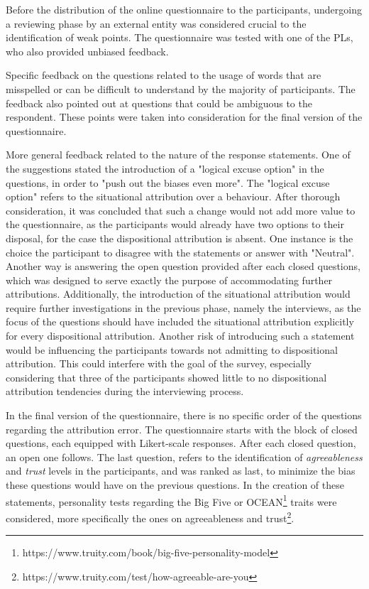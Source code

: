 Before the distribution of the online questionnaire to the participants, undergoing a reviewing phase by an external entity was considered crucial to the identification of weak points. The questionnaire was tested with one of the PLs, who also provided unbiased feedback.

Specific feedback on the questions related to the usage of words that are misspelled or can be difficult to understand by the majority of participants. The feedback also pointed out at questions that could be ambiguous to the respondent. These points were taken into consideration for the final version of the questionnaire.

More general feedback related to the nature of the response statements. One of the suggestions stated the introduction of a "logical excuse option" in the questions, in order to "push out the biases even more". The "logical excuse option" refers to the situational attribution over a behaviour. After thorough consideration, it was concluded that such a change would not add more value to the questionnaire, as the participants would already have two options to their disposal, for the case the dispositional attribution is absent. One instance is the choice the participant to disagree with the statements or answer with "Neutral". Another way is answering the open question provided after each closed questions, which was designed to serve exactly the purpose of accommodating further attributions. Additionally, the introduction of the situational attribution would require further investigations in the previous phase, namely the interviews, as the focus of the questions should have included the situational attribution explicitly for every dispositional attribution. Another risk of introducing such a statement would be influencing the participants towards not admitting to dispositional attribution. This could interfere with the goal of the survey, especially considering that three of the participants showed little to no dispositional attribution tendencies during the interviewing process. 

In the final version of the questionnaire, there is no specific order of the questions regarding the attribution error. The questionnaire starts with the block of closed questions, each equipped with Likert-scale responses. After each closed question, an open one follows. The last question, refers to the identification of \textit{agreeableness} and \textit{trust} levels in the participants, and was ranked as last, to minimize the bias these questions would have on the previous questions. In the creation of these statements, personality tests regarding the Big Five or OCEAN\footnote[1]{https://www.truity.com/book/big-five-personality-model} traits were considered, more specifically the ones on agreeableness and trust\footnote[2]{https://www.truity.com/test/how-agreeable-are-you}. 

